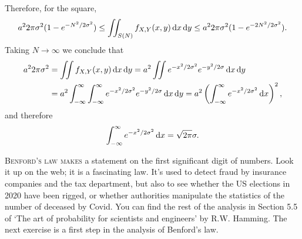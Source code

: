\documentclass[lectures]{subfiles}
\begin{document}
\begin{exercise}
\begin{solution}
Therefore, for the square,
\begin{equation}
a^{2}2\pi{\sigma^{2}} (1-e^{-N^{2}/2\sigma^{2}}) \leq
  \iint_{S(N)}f_{X,Y}(x,y) \,\textrm{d}x\,\textrm{d}y \leq
a^{2}2\pi{\sigma^{2}} (1-e^{-2N^{2}/2\sigma^{2}}).
\end{equation}
Taking $N\to\infty$ we conclude that
\begin{align}
a^{2}2\pi{\sigma^{2}}
&=\iint f_{X,Y}(x,y) \,\textrm{d}x\,\textrm{d}y
=a^{2}  \iint e^{-x^{2}/2\sigma^{2}} e^{-y^{2}/2\sigma} \,\textrm{d}x\,\textrm{d}y\\
&=a^{2}  \int_{-\infty}^{\infty} \int_{-\infty}^{\infty }e^{-x^{2}/2\sigma^{2}} e^{-y^{2}/2\sigma} \,\textrm{d}x\,\textrm{d}y
=a^{2} \left( \int_{-\infty}^{\infty }e^{-x^{2}/2\sigma^{2}} \,\textrm{d}x\right)^{2},
\end{align}
and therefore
\begin{equation}
\label{eq:18}
\int_{-\infty}^{\infty }e^{-x^{2}/2\sigma^{2}} \,\textrm{d}x = \sqrt{2 \pi}\sigma.
\end{equation}
\end{solution}
\end{exercise}


\textsc{Benford's law makes} a statement on the first significant digit of numbers.
Look it up on the web; it is a fascinating law.
It's used to detect fraud by insurance companies and the tax department, but also to see whether the US elections in 2020 have been rigged, or whether authorities manipulate the statistics of the number of deceased by Covid.
You can find the rest of the analysis in Section 5.5 of `The art of probability for scientists and engineers' by R.W.
Hamming. The next exercise is a first step in the analysis of Benford's law.
\end{document}
